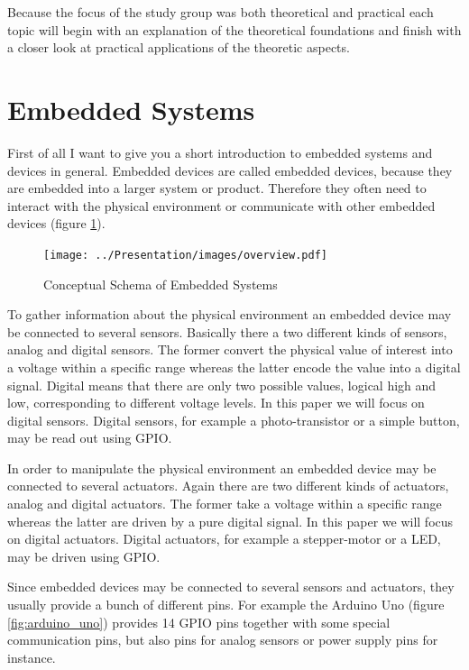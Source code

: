 \documentclass[pdftex,12pt,a4paper,fleqn]{scrartcl}
\begin{document}
Because the focus of the study group was both theoretical and practical each topic will begin with an explanation of the theoretical foundations and finish with a closer look at practical applications of the theoretic aspects.


\section{Embedded Systems}
First of all I want to give you a short introduction to embedded systems and devices in general. Embedded devices are called embedded devices, because they are embedded into a larger system or product. Therefore they often need to interact with the physical environment or communicate with other embedded devices (figure \ref{fig:embedded_systems}).

\begin{figure}[H]	
	\centering
    \texttt{[image: ../Presentation/images/overview.pdf]}
    \caption{Conceptual Schema of Embedded Systems}
    \label{fig:embedded_systems}
\end{figure}

To gather information about the physical environment an embedded device may be connected to several sensors. Basically there a two different kinds of sensors, analog and digital sensors. The former convert the physical value of interest into a voltage within a specific range whereas the latter encode the value into a digital signal. Digital means that there are only two possible values, logical high and low, corresponding to different voltage levels. In this paper we will focus on digital sensors. Digital sensors, for example a photo-transistor or a simple button, may be read out using GPIO.

In order to manipulate the physical environment an embedded device may be connected to several actuators. Again there are two different kinds of actuators, analog and digital actuators. The former take a voltage within a specific range whereas the latter are driven by a pure digital signal. In this paper we will focus on digital actuators. Digital actuators, for example a stepper-motor or a LED, may be driven using GPIO.

Since embedded devices may be connected to several sensors and actuators, they usually provide a bunch of different pins. For example the Arduino Uno (figure \ref{fig:arduino_uno}) provides 14 GPIO pins together with some special communication pins, but also pins for analog sensors or power supply pins for instance.
\end{document}
